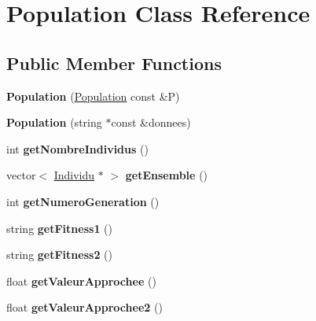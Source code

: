 \hypertarget{class_population}{}\section{Population Class Reference}
\label{class_population}
\subsection*{Public Member Functions}
\begin{DoxyCompactItemize}
\item 
\mbox{\label{class_population_afb8bfdf1315ba757c6e616e3dcb7c0bb}} 
{\bfseries Population} (\hyperlink{class_population}{Population} const \&P)
\item 
\mbox{\label{class_population_ab59130d62b27514555a07cea55896561}} 
{\bfseries Population} (string $\ast$const \&donnees)
\item 
\mbox{\label{class_population_ad6af7c30607b65d2b7f8d4750443bc0b}} 
int {\bfseries get\+Nombre\+Individus} ()
\item 
\mbox{\label{class_population_a50f2ca4404612cd2c6e4b1e90e34959b}} 
vector$<$ \hyperlink{class_individu}{Individu} $\ast$ $>$ {\bfseries get\+Ensemble} ()
\item 
\mbox{\label{class_population_ab43617fa07bb45f18b426f3677243799}} 
int {\bfseries get\+Numero\+Generation} ()
\item 
\mbox{\label{class_population_ae0fc085745b5611153c46e02e08fb367}} 
string {\bfseries get\+Fitness1} ()
\item 
\mbox{\label{class_population_a790aa479d01d5164ab47e107f7002287}} 
string {\bfseries get\+Fitness2} ()
\item 
\mbox{\label{class_population_a835c9a996c627d5e7672f880ef390499}} 
float {\bfseries get\+Valeur\+Approchee} ()
\item 
\mbox{\label{class_population_a09cd27021be2dede623dd010f6a8ddd6}} 
float {\bfseries get\+Valeur\+Approchee2} ()

\end{DoxyCompactItemize}
